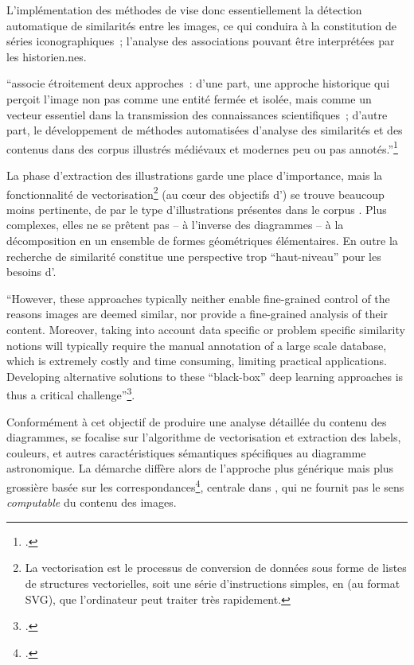 L'implémentation des méthodes de \dl vise donc essentiellement
la détection automatique de similarités entre les images, ce qui
conduira à la constitution de séries iconographiques~; l'analyse des
associations pouvant être interprétées par les historien.nes.

\begin{kwote}                     
``\vhs associe étroitement deux approches~: d'une part, une approche
historique qui perçoit l'image non pas comme une entité fermée et
isolée, mais comme un vecteur essentiel dans la transmission des
connaissances scientifiques~; d'autre part, le développement de méthodes
automatisées d'analyse des similarités et des contenus dans des corpus
illustrés médiévaux et modernes peu ou pas annotés.''\footcite{noauthor_vision_nodate}
                \end{kwote}       

La phase d'extraction des illustrations garde une place d'importance,
mais la fonctionnalité de vectorisation\footnote{La vectorisation est le
  processus de conversion de données sous forme de listes de structures
  vectorielles, soit une série d'instructions simples, en \xml (au format
  SVG), que l'ordinateur peut traiter très rapidement.} (au cœur des
objectifs d'\eida) se trouve beaucoup moins pertinente, de par le type
d'illustrations présentes dans le corpus \vhs. Plus complexes, elles ne
se prêtent pas -- à l'inverse des diagrammes -- à la décomposition en un
ensemble de formes géométriques élémentaires. En outre la recherche de
similarité constitue une perspective trop ``haut-niveau'' pour les
besoins d'\eida.

\begin{kwote}                     
``However, these approaches typically neither enable fine-grained
control of the reasons images are deemed similar, nor provide a
fine-grained analysis of their content. Moreover, taking into account
data specific or problem specific similarity notions will typically
require the manual annotation of a large scale database, which is
extremely costly and time consuming, limiting practical applications.
Developing alternative solutions to these ``black-box'' deep learning
approaches is thus a critical challenge''\footcite{husson_eida_2022}.
\end{kwote}       

Conformément à cet objectif de produire une analyse détaillée du contenu
des diagrammes, \eida se focalise sur l'algorithme de vectorisation et
extraction des labels, couleurs, et autres caractéristiques sémantiques
spécifiques au diagramme astronomique. La démarche diffère alors de
l'approche plus générique mais plus grossière basée sur les
correspondances\footcite{kaoua_image_2021}, centrale dans \vhs,
qui ne fournit pas le sens \emph{computable} du contenu des images.

